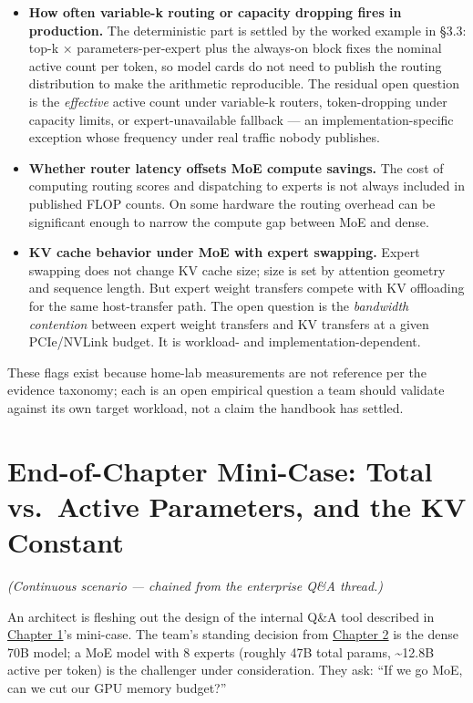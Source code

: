 \begin{itemize}
\tightlist
\item
  \textbf{How often variable-k routing or capacity dropping fires in
  production.} The deterministic part is settled by the worked example
  in §3.3: top-k × parameters-per-expert plus the always-on block fixes
  the nominal active count per token, so model cards do not need to
  publish the routing distribution to make the arithmetic reproducible.
  The residual open question is the \emph{effective} active count under
  variable-k routers, token-dropping under capacity limits, or
  expert-unavailable fallback --- an implementation-specific exception
  whose frequency under real traffic nobody publishes.
\item
  \textbf{Whether router latency offsets MoE compute savings.} The cost
  of computing routing scores and dispatching to experts is not always
  included in published FLOP counts. On some hardware the routing
  overhead can be significant enough to narrow the compute gap between
  MoE and dense.
\item
  \textbf{KV cache behavior under MoE with expert swapping.} Expert
  swapping does not change KV cache size; size is set by attention
  geometry and sequence length. But expert weight transfers compete with
  KV offloading for the same host-transfer path. The open question is
  the \emph{bandwidth contention} between expert weight transfers and KV
  transfers at a given PCIe/NVLink budget. It is workload- and
  implementation-dependent.
\end{itemize}

These flags exist because home-lab measurements are not reference per
the evidence taxonomy; each is an open empirical question a team should
validate against its own target workload, not a claim the handbook has
settled.

\section{End-of-Chapter Mini-Case: Total vs.~Active Parameters, and the
KV
Constant}\label{end-of-chapter-mini-case-total-vs.-active-parameters-and-the-kv-constant}

\emph{(Continuous scenario --- chained from the enterprise Q\&A
thread.)}

An architect is fleshing out the design of the internal Q\&A tool
described in \hyperref[chap:1]{Chapter 1}'s mini-case. The team's standing decision from
\hyperref[chap:2]{Chapter 2} is the dense 70B model; a MoE model with 8 experts (roughly
47B total params, \textasciitilde12.8B active per token) is the
challenger under consideration. They ask: ``If we go MoE, can we cut our
GPU memory budget?''

